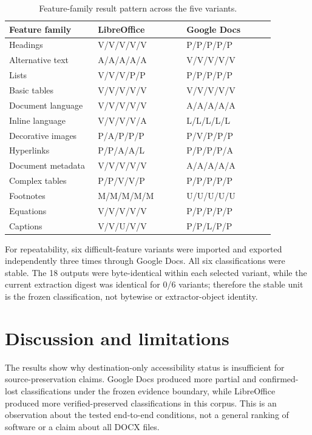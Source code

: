 \documentclass[10pt]{article}
\begin{document}
\begin{table}[h]
\centering
\scriptsize
\caption{Feature-family result pattern across the five variants.}
\label{tab:feature}
\begin{tabular}{>{\raggedright\arraybackslash}p{0.29\linewidth}p{0.29\linewidth}p{0.29\linewidth}}
\toprule
Feature family & LibreOffice & Google Docs\\
\midrule
Headings & V/V/V/V/V & P/P/P/P/P\\
Alternative text & A/A/A/A/A & V/V/V/V/V\\
Lists & V/V/V/P/P & P/P/P/P/P\\
Basic tables & V/V/V/V/V & V/V/V/V/V\\
Document language & V/V/V/V/V & A/A/A/A/A\\
Inline language & V/V/V/V/A & L/L/L/L/L\\
Decorative images & P/A/P/P/P & P/V/P/P/P\\
Hyperlinks & P/P/A/A/L & P/P/P/P/A\\
Document metadata & V/V/V/V/V & A/A/A/A/A\\
Complex tables & P/P/V/V/P & P/P/P/P/P\\
Footnotes & M/M/M/M/M & U/U/U/U/U\\
Equations & V/V/V/V/V & P/P/P/P/P\\
Captions & V/V/U/V/V & P/P/L/P/P\\
\bottomrule
\end{tabular}
\end{table}

For repeatability, six difficult-feature variants were imported and exported independently three times through Google Docs. All six classifications were stable. The 18 outputs were byte-identical within each selected variant, while the current extraction digest was identical for 0/6 variants; therefore the stable unit is the frozen classification, not bytewise or extractor-object identity.

\section{Discussion and limitations}
The results show why destination-only accessibility status is insufficient for source-preservation claims. Google Docs produced more partial and confirmed-lost classifications under the frozen evidence boundary, while LibreOffice produced more verified-preserved classifications in this corpus. This is an observation about the tested end-to-end conditions, not a general ranking of software or a claim about all DOCX files.
\end{document}
